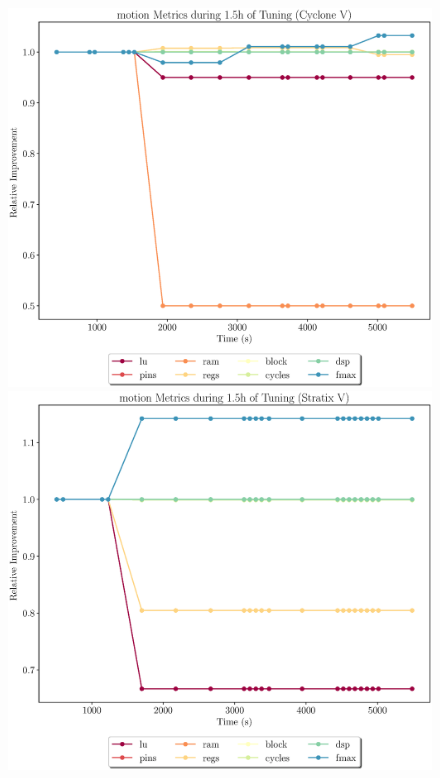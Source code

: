 \documentclass[12pt, a4paper]{article}
\begin{document}
\begin{figure}[htpb]
    \begin{minipage}{.48\textwidth}
        \includegraphics[scale=.25]{motion_all_5400_chstone_CycloneV}
    \end{minipage}%
    \hfill
    \begin{minipage}{.48\textwidth}
        \includegraphics[scale=.25]{motion_all_5400_chstone_StratixV}
    \end{minipage}%
\end{figure}
\end{document}
